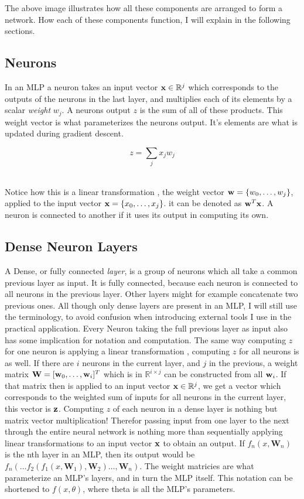 \noindent
The above image illustrates how all these components are arranged to form a network. How each of these components function, I will explain in the following sections.

\subsection*{Neurons}\label{nn:neurons}
In an MLP a neuron takes an input vector $\mathbf{x} \in \mathbb{R}^j$ which corresponds to the outputs of the neurons in the last layer, and multiplies each of its elements by a scalar \textit{weight} $w_j$. A neurons output $z$ is the sum of all of these products. This weight vector is what parameterizes the neurons output. It's elements are what is updated during gradient descent.

\begin{equation}\label{nn:neuron_z}
    z = \sum_{j}x_j w_j
\end{equation}

\noindent
\\ Notice how this is a linear transformation , the weight vector $\mathbf{w} = \{ w_0, \dots, w_j \}$, applied to the input vector $\mathbf{x} = \{ x_0, \dots, x_j\}$. it can be denoted as $\mathbf{w}^T \mathbf{x}$. A neuron is connected to another if it uses its output in computing its own.

\subsection*{Dense Neuron Layers}\label{nn:layers}
A Dense, or fully connected \textit{layer}, is a group of neurons which all take a common previous layer as input. It is fully connected, because each neuron is connected to all neurons in the previous layer. Other layers might for example concatenate two previous ones. All though only dense layers are present in an MLP, I will still use the terminology, to avoid confusion when introducing external tools I use in the practical application. Every Neuron taking the full previous layer as input also has some implication for notation and computation. The same way computing $z$ for one neuron is applying a linear transformation , computing $z$ for all neurons is as well. If there are $i$ neurons in the current layer, and $j$ in the previous, a weight matrix $\mathbf{W} = [\mathbf{w}_0 , \dots, \mathbf{w}_i]^T$ which is in $\mathbb{R}^{i \times j}$ can be constructed from all $\mathbf{w}_i$. If that matrix then is applied to an input vector $\mathbf{x} \in \mathbb{R}^j$, we get a vector which corresponds to the weighted sum of inputs for all neurons in the current layer, this vector is $\mathbf{z}$. Computing $z$ of each neuron in a dense layer is nothing but matrix vector multiplication! Therefor passing input from one layer to the next through the entire neural network is nothing more than sequentially applying linear transformations to an input vector $\mathbf{x}$ to obtain an output. If $f_n(x,\textbf{W}_n)$ is the nth layer in an MLP, then its output would be $f_n (\dots f_2 (f_1 (x, \textbf{W}_1), \textbf{W}_2) \dots, \textbf{W}_n)$. The weight matricies are what parameterize an MLP's layers, and in turn the MLP itself. This notation can be shortened to $f(x, \theta)$, where theta is all the MLP's parameters.

